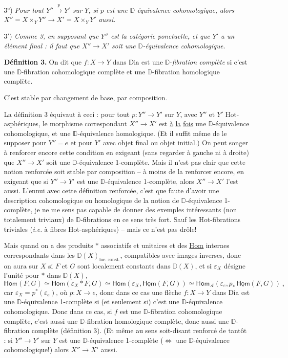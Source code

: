 \documentclass[11pt]{article}
\newcommand{\msp}[1]{\marginpar{\footnotesize [#1]}}
\newcommand{\Hot}{\textsf{Hot}}
\newcommand{\Dia}{\textsf{Dia}}
\newcommand{\Hom}{\textsf{Hom}}
\newcommand{\DD}{\mathbb{D}}
\begin{document}
3°) \textit{Pour tout $Y'' \overset{p}{\to} Y'$ sur $Y$, si $p$ est une $\DD$-équivalence cohomologique, alors $X'' = X \times_Y Y'' \longrightarrow X' = X \times_Y Y'$ aussi.}

3$'$) \textit{Comme 3, en supposant que $Y''$ est la catégorie ponctuelle, et que $Y'$ a un élément final : il faut que $X'' \to X'$ soit une $\DD$-équivalence cohomologique.}

\msp{page 105}
\textbf{Définition 3.} On dit que $f : X \to Y$ dans \Dia{} est une $\DD$-\textit{fibration complète} si c’est une $\DD$-fibration cohomologique complète et une $\DD$-fibration homologique complète.

C’est stable par changement de base, par composition.

La définition 3 équivaut à ceci : pour tout $p : Y'' \to Y'$ sur $Y$, avec $Y''$ et $Y'$ \Hot-asphériques, le morphisme correspondant $X'' \to X'$ est \underline{à} \underline{la} \underline{fois} une $\DD$-équivalence cohomologique, et une $\DD$-équivalence homologique. (Et il suffit même de le supposer pour $Y'' = e$ et pour $Y'$ avec objet final ou objet initial.) On peut songer à renforcer encore cette condition en exigeant (sans regarder à gauche ni à droite) que $X'' \to X'$ soit une $\DD$-équivalence 1-complète. Mais il n’est pas clair que cette notion renforcée soit stable par composition – à moins de la renforcer encore, en exigeant que si $Y'' \to Y'$ est une $\DD$-équivalence 1-complète, alors $X'' \to X'$ l’est aussi. L’ennui avec cette définition renforcée, c’est que faute d’avoir une description cohomologique ou homologique de la notion de
\msp{page 106}
$\DD$-équivalence 1-complète, je ne me sens pas capable de donner des exemples intéressants (non totalement triviaux) de $\DD$-fibrations en ce sens très fort. Sauf les \Hot-fibrations triviales (\textit{i.e.} à fibres \Hot-asphériques) – mais ce n’est pas drôle!

Mais quand on a des produits $*$ associatifs et unitaires et des \underline{\Hom} internes correspondants dans les $\DD(X)_{\mathrm{loc.\ const.}}$, compatibles avec images inverses, donc on aura sur $X$ si $F$ et $G$ sont localement constants dans $\DD(X)$, et si $\varepsilon_X$ désigne l’unité pour $*$ dans $\DD(X)$,
\[
\Hom(F,G) \simeq \Hom(\varepsilon_X * F, G) \simeq \Hom(\varepsilon_X, \underline{\Hom}(F,G)) \simeq \Hom_{\mathcal{A}}(\varepsilon_e, p_*\, \underline{\Hom}(F,G)) \ ,
\]
car $\varepsilon_X = p^*(\varepsilon_e)$, où $p : X \to e$, donc dans ce cas une flèche $f : X \to Y$ dans \Dia{} est une $\DD$-équivalence 1-complète si (et seulement si) c’est une $\DD$-équivalence cohomologique. Donc dans ce cas, si $f$ est une $\DD$-fibration cohomologique complète, c’est aussi une $\DD$-fibration homologique complète, donc aussi une $\DD$-fibration complète (définition 3). (Et même au sens soit-disant renforcé de tantôt : si $Y'' \to Y'$ sur $Y$ est une $\DD$-équivalence 1-complète ($\Leftrightarrow$ une $\DD$-équivalence cohomologique!) alors $X'' \to X'$ aussi. %
\end{document}
